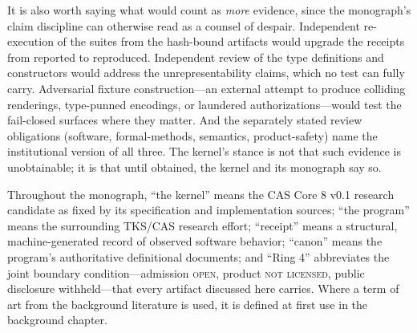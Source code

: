 It is also worth saying what would count as \emph{more} evidence,
since the monograph's claim discipline can otherwise read as a counsel
of despair. Independent re-execution of the suites from the hash-bound
artifacts would upgrade the receipts from reported to reproduced.
Independent review of the type definitions and constructors would
address the unrepresentability claims, which no test can fully carry.
Adversarial fixture construction---an external attempt to produce
colliding renderings, type-punned encodings, or laundered
authorizations---would test the fail-closed surfaces where they matter.
And the separately stated review obligations (software,
formal-methods, semantics, product-safety) name the institutional
version of all three. The kernel's stance is not that such evidence is
unobtainable; it is that until obtained, the kernel and its monograph
say so.

\begin{remark}[Terminology]\label{ch01:terminology}
Throughout the monograph, ``the kernel'' means the CAS Core 8 v0.1
research candidate as fixed by its specification and implementation
sources; ``the program'' means the surrounding TKS/CAS research effort;
``receipt'' means a structural, machine-generated record of observed
software behavior; ``canon'' means the program's authoritative
definitional documents; and ``Ring 4'' abbreviates the joint boundary
condition---admission \textsc{open}, product \textsc{not licensed},
public disclosure withheld---that every artifact discussed here
carries. Where a term of art from the background literature is used, it
is defined at first use in the background chapter.
\end{remark}
